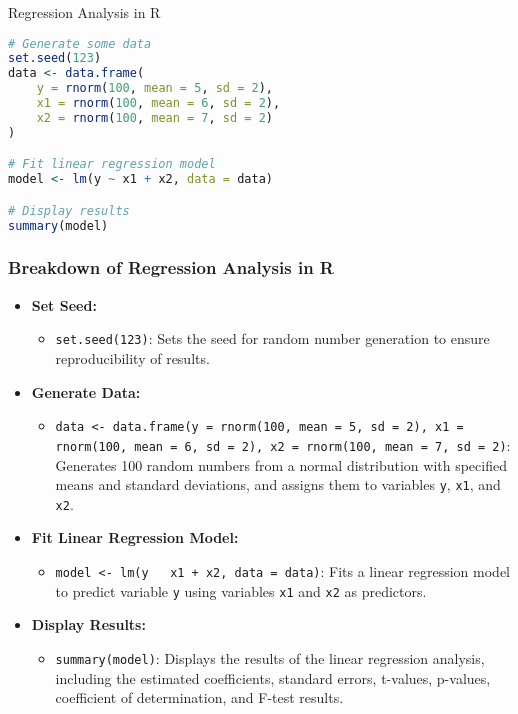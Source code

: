 \documentclass[serif, 9pt, aspectratio=32]{beamer}
\begin{document}
\begin{frame}[fragile]{Regression Analysis in R}
    \begin{lstlisting}[language=R]
# Generate some data
set.seed(123)
data <- data.frame(
    y = rnorm(100, mean = 5, sd = 2),
    x1 = rnorm(100, mean = 6, sd = 2),
    x2 = rnorm(100, mean = 7, sd = 2)
)

# Fit linear regression model
model <- lm(y ~ x1 + x2, data = data)

# Display results
summary(model)
    \end{lstlisting}
\end{frame}

\begin{frame}
    \frametitle{Breakdown of Regression Analysis in R}
    \begin{itemize}
        \setlength{\itemsep}{2em}
        \item \textbf{Set Seed:}
              \begin{itemize}
                  \item \texttt{set.seed(123)}: Sets the seed for random number generation to ensure reproducibility of results.
              \end{itemize}

        \item \textbf{Generate Data:}
              \begin{itemize}
                  \item \texttt{data <- data.frame(y = rnorm(100, mean = 5, sd = 2), x1 = rnorm(100, mean = 6, sd = 2), x2 = rnorm(100, mean = 7, sd = 2)}: Generates 100 random numbers from a normal distribution with specified means and standard deviations, and assigns them to variables \texttt{y}, \texttt{x1}, and \texttt{x2}.
              \end{itemize}

        \item \textbf{Fit Linear Regression Model:}
              \begin{itemize}
                  \item \texttt{model <- lm(y ~ x1 + x2, data = data)}: Fits a linear regression model to predict variable \texttt{y} using variables \texttt{x1} and \texttt{x2} as predictors.
              \end{itemize}

        \item \textbf{Display Results:}
              \begin{itemize}
                  \item \texttt{summary(model)}: Displays the results of the linear regression analysis, including the estimated coefficients, standard errors, t-values, p-values, coefficient of determination, and F-test results.
              \end{itemize}
    \end{itemize}
\end{frame}
\end{document}
